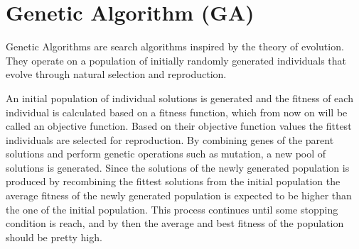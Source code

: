 \documentclass{article}
\begin{document}
\section{Genetic Algorithm (GA)}




Genetic Algorithms are search algorithms inspired by the theory of evolution. They operate on a population of initially randomly generated individuals that evolve through natural selection and reproduction. 


An initial population of individual solutions is generated and the fitness of each individual is calculated based on a fitness function, which from now on will be called an objective function. Based on their objective function values the fittest individuals are selected for reproduction. By combining genes of the parent solutions and perform genetic operations such as mutation, a new pool of solutions is generated. Since the solutions of the newly generated population is produced by recombining the fittest solutions from the initial population the average fitness of the newly generated population is expected to be higher than the one of the initial population. This process continues until some stopping condition is reach, and by then the average and best fitness of the population should be pretty high.
\end{document}
